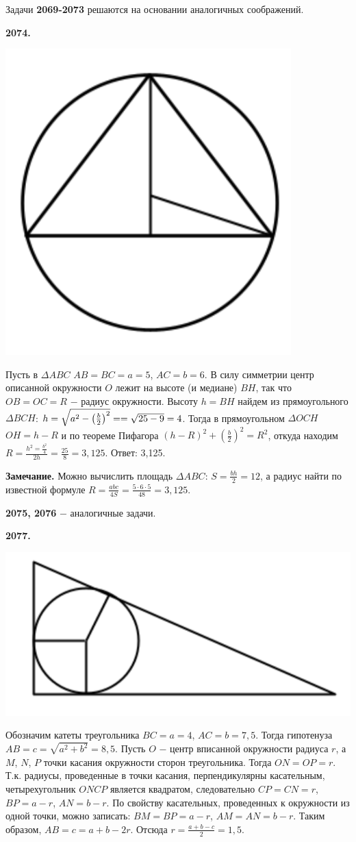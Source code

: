 Задачи \textbf{2069-2073}  решаются на основании аналогичных соображений.

\textbf{2074.}

{\centering \includegraphics[width=0.35\linewidth]{Geometry/Content/37.png}
	
}

Пусть в $\Delta ABC$ $AB = BC = a = 5$, $AC = b = 6$. В силу симметрии центр описанной окружности $O$ лежит на  высоте (и медиане) $BH$, так что  $OB=OC=R$ $-$ радиус окружности. Высоту $h = BH$ найдем из прямоугольного $\Delta BCH$: $h = \sqrt{a^2-\left( \frac{b}{2} \right)^2} = \linebreak=\sqrt{25-9} = 4$. Тогда в прямоугольном $\Delta OCH$ $OH = h - R$ и по теореме Пифагора $(h - R)^2 + \left( \frac{b}{2} \right)^2 = R^2$, откуда находим $R = \frac{h^2  =\frac{b^2}{4}}{2h} = \frac{25}{8} = 3,125.$ \newline \null \hspace*{\fill} Ответ: 3,125.

\textbf{Замечание.} Можно вычислить площадь $\Delta ABC$: $S = \frac{bh}{2}=12$, а радиус 
найти по известной формуле $R = \frac{abc}{4S} = \frac{5\cdot6\cdot5}{48} = 3,125$.

\textbf{2075, 2076} $-$ аналогичные задачи.

\textbf{2077.}

{\centering \includegraphics[width=0.5\linewidth]{Geometry/Content/38.png}
	
}

Обозначим  катеты треугольника $BC = a= 4$, $AC = b = 7,5$. Тогда гипотенуза $AB = c = \sqrt{a^2 + b^2} = 8,5$.  Пусть $O$ $-$ центр вписанной окружности радиуса $r$, а $M$, $N$, $P$ точки касания окружности сторон треугольника. Тогда $ON = OP = r$. Т.к. радиусы, проведенные в точки касания, перпендикулярны касательным, четырехугольник $ONCP$ является квадратом, следовательно $CP = CN = r$, $BP = a - r$, $AN = b - r$. По свойству касательных, проведенных к окружности из одной точки, можно записать: $BM = BP = a- r$, $AM = AN = b - r$. Таким образом, $AB = c = a + b - 2r$. Отсюда $r = \frac{a + b - c}{2} = 1,5$.

